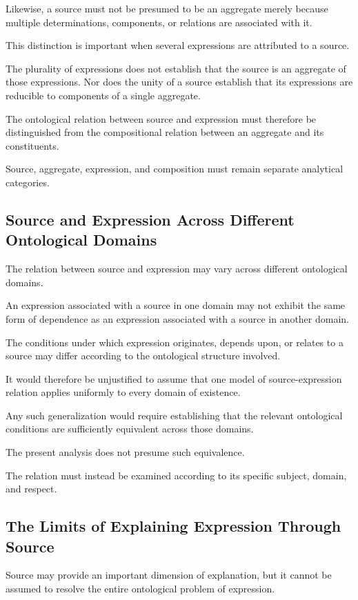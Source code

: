 Likewise, a source must not be presumed to
be an aggregate merely because multiple
determinations, components, or relations
are associated with it.

This distinction is important when several
expressions are attributed to a source.

The plurality of expressions does not establish
that the source is an aggregate of those expressions.
Nor does the unity of a source establish that
its expressions are reducible to components
of a single aggregate.

The ontological relation between source and
expression must therefore be distinguished
from the compositional relation between
an aggregate and its constituents.

Source, aggregate, expression, and composition
must remain separate analytical categories.

\subsection{Source and Expression Across Different Ontological Domains}

The relation between source and expression
may vary across different ontological domains.

An expression associated with a source in one
domain may not exhibit the same form of dependence
as an expression associated with a source
in another domain.

The conditions under which expression originates,
depends upon, or relates to a source may differ
according to the ontological structure involved.

It would therefore be unjustified to assume
that one model of source-expression relation
applies uniformly to every domain of existence.

Any such generalization would require establishing
that the relevant ontological conditions are
sufficiently equivalent across those domains.

The present analysis does not presume such
equivalence.

The relation must instead be examined according
to its specific subject, domain, and respect.

\subsection{The Limits of Explaining Expression Through Source}

Source may provide an important dimension
of explanation, but it cannot be assumed
to resolve the entire ontological problem
of expression.

